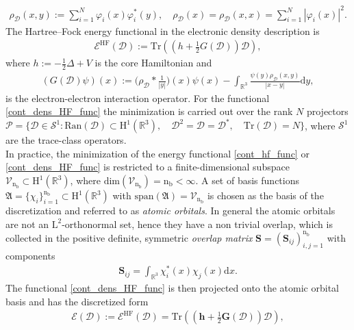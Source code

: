 \documentclass[reqno]{amsart}
\begin{document}
\begin{align*}
    \rho_{\mathscr{D}}(x,y):= \sum^{N}_{i=1}\varphi_i(x)\varphi^*_i(y),\quad \rho_{\mathscr{D}}(x)=\rho_{\mathscr{D}}(x,x)=\sum^N_{i=1}|\varphi_i(x)|^2.
\end{align*}
The Hartree–Fock energy functional in the electronic density description is
\begin{align}\label{cont_dens_HF_func}
    \mathcal{E}^{\mathrm{HF}}(\mathscr{D}):= \text{Tr}((h+\tfrac{1}{2}G(\mathscr{D}))\mathscr{D}),
\end{align}
where $h:=-\frac{1}{2}\Delta+V$ is the core Hamiltonian and 
\begin{align*}
    (G(\mathscr{D})\psi)(x):=\Big(\rho_{\mathscr{D}} \ast \frac{1}{|y|}\Big)(x)\psi(x)-\int_{\mathbb{R}^3}\frac{\psi(y)\rho_{\mathscr{D}}(x,y)}{|x-y|}\mathrm{d}y,
\end{align*}
is the electron-electron interaction operator. For the functional \eqref{cont_dens_HF_func} the minimization is carried out over the rank $N$ projectors $\mathcal{P}=\big\lbrace \mathscr{D}\in \mathscr{S}^1: \text{Ran}(\mathscr{D})\subset \mathrm{H}^1(\mathbb{R}^3),\quad \mathscr{D}^2=\mathscr{D}=\mathscr{D}^*, \quad \text{Tr}(\mathscr{D})=N\big\rbrace$, where $\mathscr{S}^1$ are the trace-class operators.\\
\newline In practice, the minimization of the energy functional \eqref{cont_hf_func} or \eqref{cont_dens_HF_func} is restricted to a finite-dimensional subspace $\mathcal{V}_{\mathrm{n}_{\text{b}}}\subset \mathrm{H}^1(\mathbb{R}^3)$, where $\text{dim}(\mathcal{V}_{\text{n}_\text{b}})=\text{n}_\text{b}<\infty$. A set of basis functions $\mathfrak{A}=\lbrace \chi_i\rbrace_{i=1}^{\text{n}_\text{b}}\subset \mathrm{H}^1(\mathbb{R}^3)$ with $\text{span}(\mathfrak{A})=\mathcal{V}_{\text{n}_\text{b}}$ is chosen as the basis of the discretization and referred to as \textit{atomic orbitals}. In general the atomic orbitals are not an $\mathrm{L}^2$-orthonormal set, hence they have a non trivial overlap, which is collected in the positive definite, symmetric  \textit{overlap matrix} $\mathbf{S}=(\mathbf{S}_{ij})_{i,j=1}^{\text{n}_\text{b}}$ with components
\begin{align}\label{overlap}
    \mathbf{S}_{ij}=\int_{\mathbb{R}^3}\chi_i^*(x)\chi_j(x)\mathrm{d}x.
\end{align}
The functional \eqref{cont_dens_HF_func} is then projected onto the atomic orbital basis and has the discretized form
\begin{align}\label{disc_en_func}
    \mathcal{E}(\mathscr{D}):=\mathcal{E}^{\mathrm{HF}}(\mathscr{D})=\text{Tr}((\mathbf{h}+\tfrac{1}{2}\mathbf{G}(\mathscr{D}))\mathscr{D}),
\end{align}
\end{document}
